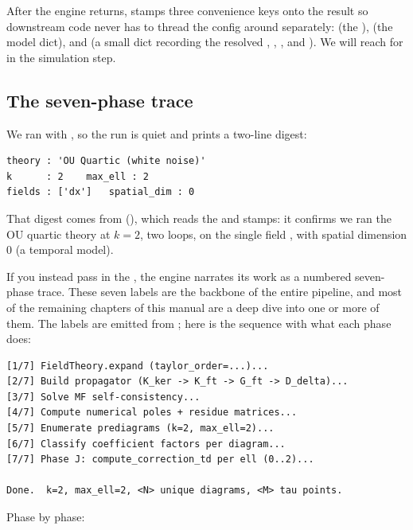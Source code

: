 After the engine returns,  stamps three convenience keys onto the
result so downstream code never has to thread the config around separately:
 (the ),  (the model dict),
and  (a small dict recording the resolved ,
, , and ). We will reach
for  in the simulation step.

\subsection{The seven-phase trace}

We ran with , so the run is quiet and  prints a
two-line digest:

\begin{lstlisting}[style=console]
theory : 'OU Quartic (white noise)'
k      : 2    max_ell : 2
fields : ['dx']   spatial_dim : 0
\end{lstlisting}

That digest comes from  (), which
reads the  and  stamps: it confirms we ran the OU
quartic theory at $k=2$, two loops, on the single field , with spatial
dimension $0$ (a temporal model).

If you instead pass  in the , the engine narrates
its work as a numbered seven-phase trace. These seven labels are the backbone of
the entire pipeline, and most of the remaining chapters of this manual are a deep
dive into one or more of them. The labels are emitted from
; here is the sequence with what each phase does:

\begin{lstlisting}[style=console]
[1/7] FieldTheory.expand (taylor_order=...)...
[2/7] Build propagator (K_ker -> K_ft -> G_ft -> D_delta)...
[3/7] Solve MF self-consistency...
[4/7] Compute numerical poles + residue matrices...
[5/7] Enumerate prediagrams (k=2, max_ell=2)...
[6/7] Classify coefficient factors per diagram...
[7/7] Phase J: compute_correction_td per ell (0..2)...

Done.  k=2, max_ell=2, <N> unique diagrams, <M> tau points.
\end{lstlisting}

Phase by phase:

